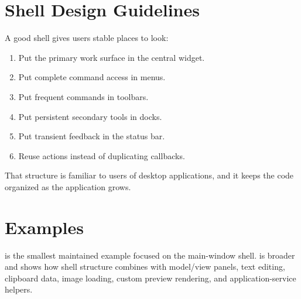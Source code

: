\section{Shell Design Guidelines}

A good shell gives users stable places to look:

\begin{enumerate}
\item Put the primary work surface in the central widget.
\item Put complete command access in menus.
\item Put frequent commands in toolbars.
\item Put persistent secondary tools in docks.
\item Put transient feedback in the status bar.
\item Reuse actions instead of duplicating callbacks.
\end{enumerate}

That structure is familiar to users of desktop applications, and it keeps the code organized as the application grows.

\section{Examples}

 is the smallest maintained example focused on the main-window shell.  is broader and shows how shell structure combines with model/view panels, text editing, clipboard data, image loading, custom preview rendering, and application-service helpers.
